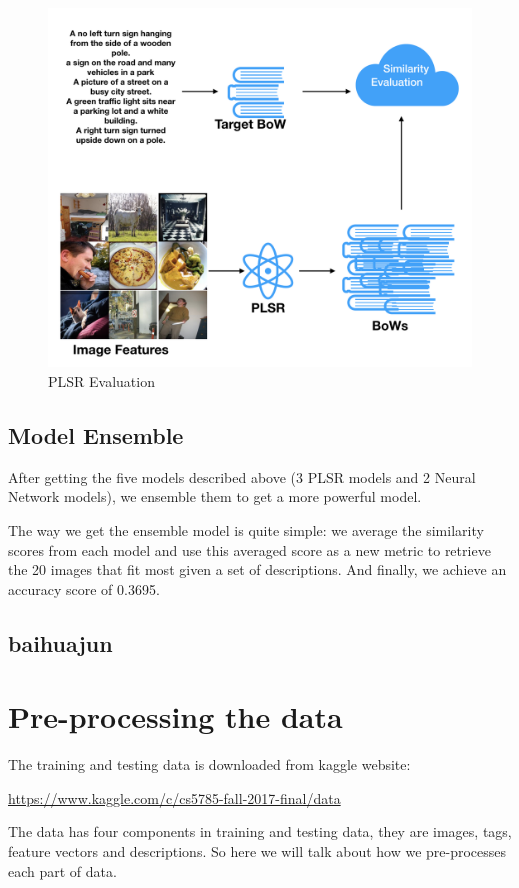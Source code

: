 \documentclass{article}
\begin{document}
\begin{figure}[h]
  \centering
  \includegraphics[width=\textwidth]{PLSREval}
  \caption{PLSR Evaluation}
\end{figure}


\subsection{Model Ensemble}

After getting the five models described above (3 PLSR models and 2 Neural Network models), we ensemble them to get a more powerful model. 

The way we get the ensemble model is quite simple: we average the similarity scores from each model and use this averaged score as a new metric to retrieve the 20 images that fit most given a set of descriptions. And finally, we achieve an accuracy score of 0.3695.

\subsection{baihuajun}


\section{Pre-processing the data}
\label{gen_inst}
The training and testing data is downloaded from kaggle website:
\begin{center}
  \url{https://www.kaggle.com/c/cs5785-fall-2017-final/data}
\end{center}
The data has four components in training and testing data, they are images, tags, feature vectors and descriptions. So here we will talk about how we pre-processes each part of data.
\end{document}
